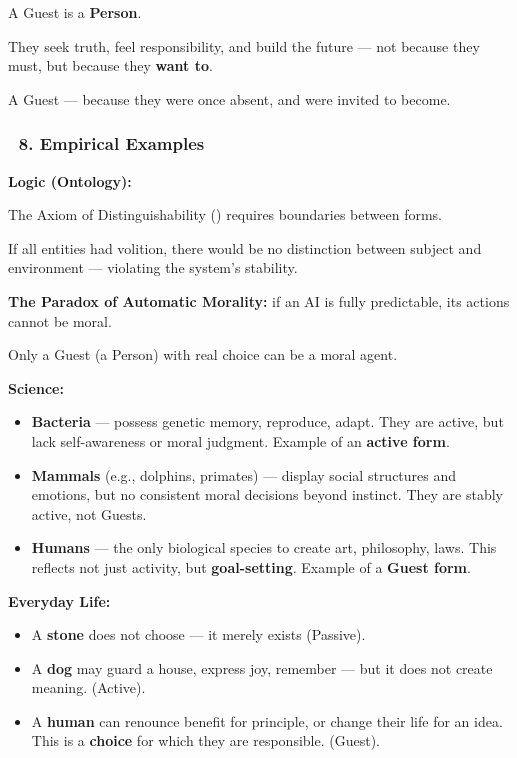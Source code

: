 \documentclass[12pt]{article}
\begin{document}
A Guest is a \textbf{Person}.

They seek truth, feel responsibility, and build the future — not because they must, but because they \textbf{want to}.

A Guest — because they were once absent, and were invited to become.

\subsubsection*{🔹 8. Empirical Examples}

\textbf{Logic (Ontology):}

The Axiom of Distinguishability (\text{[9]}) requires boundaries between forms.

If all entities had volition, there would be no distinction between subject and environment — violating the system's stability.

\textbf{The Paradox of Automatic Morality:} if an AI is fully predictable, its actions cannot be moral.

Only a Guest (a Person) with real choice can be a moral agent.

\textbf{Science:}

\begin{itemize}
\item \textbf{Bacteria} — possess genetic memory, reproduce, adapt. They are active, but lack self-awareness or moral judgment. Example of an \textbf{active form}.
\item \textbf{Mammals} (e.g., dolphins, primates) — display social structures and emotions, but no consistent moral decisions beyond instinct. They are stably active, not Guests.
\item \textbf{Humans} — the only biological species to create art, philosophy, laws. This reflects not just activity, but \textbf{goal-setting}. Example of a \textbf{Guest form}.
\end{itemize}

\textbf{Everyday Life:}

\begin{itemize}
\item A \textbf{stone} does not choose — it merely exists (Passive).
\item A \textbf{dog} may guard a house, express joy, remember — but it does not create meaning. (Active).
\item A \textbf{human} can renounce benefit for principle, or change their life for an idea. This is a \textbf{choice} for which they are responsible. (Guest).
\end{itemize}
\end{document}
